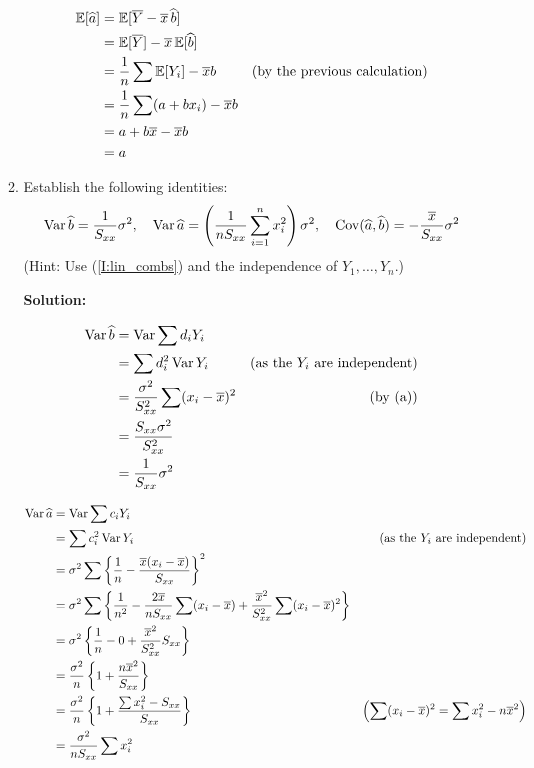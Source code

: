 \documentclass[12pt]{amsart}
\newcommand{\sol}{\bigskip\noindent\textbf{Solution: }}
\begin{document}
\begin{enumerate}
\begin{enumerate}
        \begin{align*}
            \operatorname{\mathbb{E}}[\widehat a] &= \operatorname{\mathbb{E}}[\overline Y - \overline x\, \widehat b]\\
            &= \operatorname{\mathbb{E}}[\overline Y] - \overline x\operatorname{\mathbb{E}}[\widehat b]\\
            &= \frac1n\sum\operatorname{\mathbb{E}}[Y_i] - \overline x b&\text{(by the previous calculation)}\\
            &= \frac1n\sum(a + bx_i) - \overline x b\\
            &= a + b\overline x - \overline x b\\
            &= a
        \end{align*}
        
        \item\label{I:variances} Establish the following identities:
        \[
            \operatorname{Var}\widehat b = \frac1{S_{xx}}\sigma^2,\quad
            \operatorname{Var}\widehat a = \left(\frac1{nS_{xx}}\sum_{i=1}^n x_i^2\right)\sigma^2,\quad
            \operatorname{Cov}(\widehat a, \widehat b) = -\frac{\overline x}{S_{xx}}\sigma^2
        \]
        (Hint: Use (\ref{I:lin_combs}) and the independence of $Y_1,\ldots,Y_n$.)

        \sol

        \begin{align*}
            \operatorname{Var} \widehat b &= \operatorname{Var} \sum d_iY_i\\
            &= \sum d_i^2 \operatorname{Var} Y_i&\text{(as the $Y_i$ are independent)}\\
            &= \frac{\sigma^2}{S_{xx}^2}\sum (x_i - \overline x)^2&\text{(by (a))}\\
            &= \frac{S_{xx}\sigma^2}{S_{xx}^2}\\
            &= \frac1{S_{xx}}\sigma^2
        \end{align*}

        \begin{align*}
            \operatorname{Var} \widehat a &= \operatorname{Var} \sum c_iY_i\\
            &= \sum c_i^2 \operatorname{Var} Y_i&\text{(as the $Y_i$ are independent)}\\
            &= \sigma^2\sum\left\{\frac1{n} - \frac{\overline x(x_i - \overline x)}{S_{xx}}\right\}^2\\
            &= \sigma^2\sum\left\{\frac 1{n^2} - \frac{2\overline x}{n S_{xx}}\sum(x_i - \overline x)
            + \frac{{\overline x}^2}{S_{xx}^2}\sum(x_i - \overline x)^2\right\}\\
            &= \sigma^2\left\{\frac1n - 0
            + \frac{{\overline x}^2}{S_{xx}^2} S_{xx}\right\}\\
            &= \frac{\sigma^2}n\left\{1 + \frac{n{\overline x}^2}{S_{xx}}\right\}\\
            &= \frac{\sigma^2}n\left\{1 + \frac{\sum x_i^2 - S_{xx}}{S_{xx}}\right\}
            &\left(\sum(x_i - \overline x)^2 = \sum x_i^2 - n\overline x^2\right)\\
            &= \frac{\sigma^2}{nS_{xx}}\sum x_i^2
        \end{align*}


\end{enumerate}
\end{enumerate}
\end{document}
